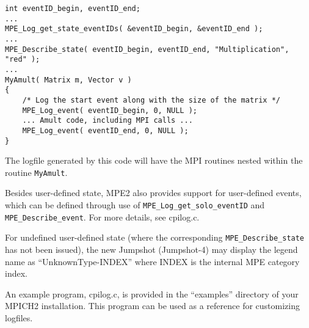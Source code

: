 \documentclass[dvipdfm,11pt]{article}
\begin{document}
\begin{verbatim}
int eventID_begin, eventID_end;
...
MPE_Log_get_state_eventIDs( &eventID_begin, &eventID_end );
...
MPE_Describe_state( eventID_begin, eventID_end, "Multiplication", "red" );
...
MyAmult( Matrix m, Vector v )
{
    /* Log the start event along with the size of the matrix */
    MPE_Log_event( eventID_begin, 0, NULL );
    ... Amult code, including MPI calls ...
    MPE_Log_event( eventID_end, 0, NULL );
}
\end{verbatim}

The logfile generated by this code will have the MPI routines nested within
the routine \texttt{MyAmult}.

Besides user-defined state, MPE2 also provides support for user-defined
events, which can be defined through use of \texttt{MPE\_Log\_get\_solo\_eventID}
and \texttt{MPE\_Describe\_event}.  For more details, see cpilog.c.

For undefined user-defined state (where the corresponding \texttt{MPE\_Describe\_state}
has not been issued), the new Jumpshot (Jumpshot-4) may display the legend name as
``UnknownType-INDEX'' where INDEX is the internal MPE category index.

An example program, cpilog.c, is provided in the ``examples'' directory of your
MPICH2 installation. This program can be used as a reference for customizing
logfiles.
\end{document}
